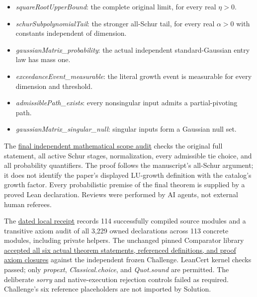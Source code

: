 \documentclass[11pt,a4paper]{article}
\providecommand{\tightlist}{\setlength{\itemsep}{0pt}\setlength{\parskip}{0pt}}
\begin{document}
\begin{itemize}
\tightlist
\item
  \textit{squareRootUpperBound}: the complete original limit, for every
  real \(\eta>0\).
\item
  \textit{schurSubpolynomialTail}: the stronger all-Schur tail, for
  every real \(\alpha>0\) with constants independent of dimension.
\item
  \textit{gaussianMatrix\_probability}: the actual independent
  standard-Gaussian entry law has mass one.
\item
  \textit{exceedanceEvent\_measurable}: the literal growth event is
  measurable for every dimension and threshold.
\item
  \textit{admissiblePath\_exists}: every nonsingular input admits a
  partial-pivoting path.
\item
  \textit{gaussianMatrix\_singular\_null}: singular inputs form a
  Gaussian null set.
\end{itemize}

The
\href{https://github.com/ajt60gaibb/OpenProblemsInNLA/blob/263a215acd295a260dec7a75ff6bebebb9789df9/linear-systems-and-elimination/IE-06/lean/reviews/final-independent-mathematical-scope-audit.md}{final
independent mathematical scope audit} checks the original full
statement, all active Schur stages, normalization, every admissible tie
choice, and all probability quantifiers. The proof follows the
manuscript's all-Schur argument; it does not identify the paper's
displayed LU-growth definition with the catalog's growth factor. Every
probabilistic premise of the final theorem is supplied by a proved Lean
declaration. Reviews were performed by AI agents, not external human
referees.

The
\href{https://github.com/ajt60gaibb/OpenProblemsInNLA/blob/263a215acd295a260dec7a75ff6bebebb9789df9/linear-systems-and-elimination/IE-06/lean/verification/local/attempt-0i_0ibma/result.json}{dated
local receipt} records 114 successfully compiled source modules and a
transitive axiom audit of all 3,229 owned declarations across 113
concrete modules, including private helpers. The unchanged pinned
Comparator library
\href{https://github.com/ajt60gaibb/OpenProblemsInNLA/blob/263a215acd295a260dec7a75ff6bebebb9789df9/linear-systems-and-elimination/IE-06/lean/verification/local/attempt-0i_0ibma/CompareSolution.lean.log}{accepted
all six actual theorem statements, referenced definitions, and proof
axiom closures} against the independent frozen Challenge. LeanCert
kernel checks passed; only \textit{propext}, \textit{Classical.choice},
and \textit{Quot.sound} are permitted. The deliberate \textit{sorry} and
native-execution rejection controls failed as required. Challenge's six
reference placeholders are not imported by Solution.
\end{document}
